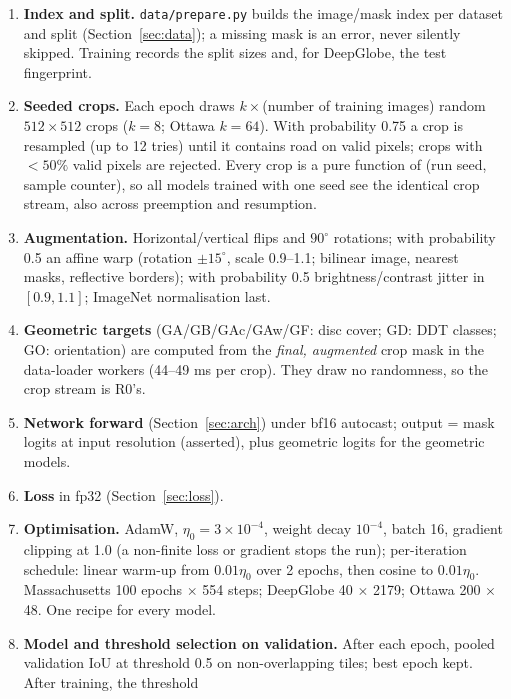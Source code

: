 \documentclass[11pt]{article}
\begin{document}
\begin{enumerate}
  \item \textbf{Index and split.} \texttt{data/prepare.py} builds the image/mask index per dataset and
        split (Section~\ref{sec:data}); a missing mask is an error, never silently skipped. Training
        records the split sizes and, for DeepGlobe, the test fingerprint.
  \item \textbf{Seeded crops.} Each epoch draws $k\times$(number of training images) random
        $512\times512$ crops ($k=8$; Ottawa $k=64$). With probability 0.75 a crop is resampled (up to
        12 tries) until it contains road on valid pixels; crops with $<50\%$ valid pixels are
        rejected. Every crop is a pure function of (run seed, sample counter), so all models trained
        with one seed see the identical crop stream, also across preemption and resumption.
  \item \textbf{Augmentation.} Horizontal/vertical flips and $90^\circ$ rotations; with probability
        0.5 an affine warp (rotation $\pm15^\circ$, scale 0.9--1.1; bilinear image, nearest masks,
        reflective borders); with probability 0.5 brightness/contrast jitter in $[0.9,1.1]$; ImageNet
        normalisation last.
  \item \textbf{Geometric targets} (GA/GB/GAc/GAw/GF: disc cover; GD: DDT classes; GO: orientation)
        are computed from the \emph{final, augmented} crop mask in the data-loader workers
        (44--49 ms per crop). They draw no randomness, so the crop stream is R0's.
  \item \textbf{Network forward} (Section~\ref{sec:arch}) under bf16 autocast; output = mask logits at
        input resolution (asserted), plus geometric logits for the geometric models.
  \item \textbf{Loss} in fp32 (Section~\ref{sec:loss}).
  \item \textbf{Optimisation.} AdamW, $\eta_0=3\times10^{-4}$, weight decay $10^{-4}$, batch 16,
        gradient clipping at 1.0 (a non-finite loss or gradient stops the run); per-iteration
        schedule: linear warm-up from $0.01\eta_0$ over 2 epochs, then cosine to $0.01\eta_0$.
        Massachusetts 100 epochs $\times$ 554 steps; DeepGlobe 40 $\times$ 2179; Ottawa 200
        $\times$ 48. One recipe for every model.
  \item \textbf{Model and threshold selection on validation.} After each epoch, pooled validation IoU
        at threshold 0.5 on non-overlapping tiles; best epoch kept. After training, the threshold

\end{enumerate}
\end{document}
